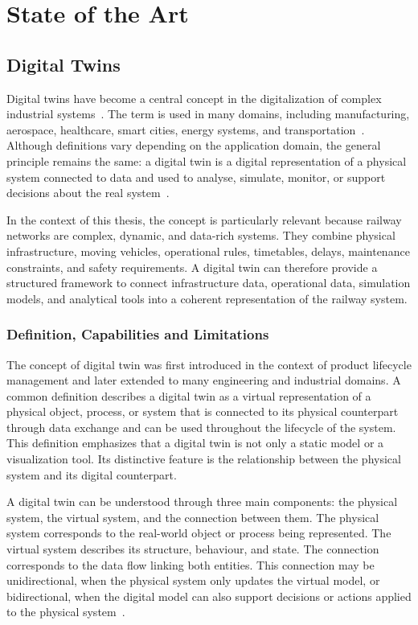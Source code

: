 \chapter{State of the Art}\label{chap:stateoftheart}

\section{Digital Twins}
Digital twins have become a central concept in the digitalization of complex industrial systems~\cite{DT_survey}. The term 
is used in many domains, including manufacturing, aerospace, healthcare, smart cities, energy systems, and 
transportation~\cite{DT_survey,aircraft_digital_twin,turbomachinery_review}. Although definitions vary depending on the 
application domain, the general principle remains the same: a digital twin is a digital representation of a physical 
system connected to data and used to analyse, simulate, monitor, or support decisions about the real 
system~\cite{grieves2017digital,DT_survey}.

In the context of this thesis, the concept is particularly relevant because railway networks are complex, dynamic, and 
data-rich systems. They combine physical infrastructure, moving vehicles, operational rules, timetables, delays, 
maintenance constraints, and safety requirements. A digital twin can therefore provide a structured framework to connect 
infrastructure data, operational data, simulation models, and analytical tools into a coherent representation of the 
railway system.

\subsection{Definition, Capabilities and Limitations}
The concept of digital twin was first introduced in the context of product lifecycle management and later extended to many 
engineering and industrial domains. A common definition describes a digital twin as a virtual representation of a physical 
object, process, or system that is connected to its physical counterpart through data exchange and can be used throughout 
the lifecycle of the system. This definition emphasizes that a digital twin is not only a static model or a visualization 
tool. Its distinctive feature is the relationship between the physical system and its digital counterpart.

A digital twin can be understood through three main components: the physical system, the virtual system, and the connection 
between them. The physical system corresponds to the real-world object or process being represented. The virtual system 
describes its structure, behaviour, and state. The connection corresponds to the data flow linking both entities. This 
connection may be unidirectional, when the physical system only updates the virtual model, or bidirectional, when the 
digital model can also support decisions or actions applied to the physical system~\cite{moshood2024infrastructure}.

